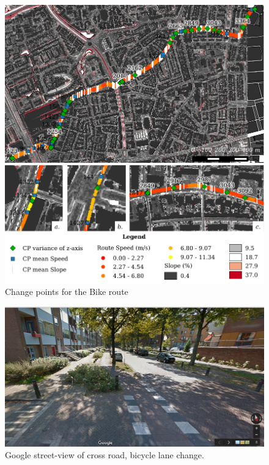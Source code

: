 \begin{figure}[hb]
\includegraphics[width=\textwidth]{img/R_Bikeroute.pdf}
\centering
\caption{Change points for the Bike route\label{routeB2}}
\end{figure} 

\clearpage

\begin{figure}[!ht]
\includegraphics[width=\textwidth]{img/R_crossroad.png}
\centering
\caption{Google street-view of cross road, bicycle lane change. \label{crossroad}}
\end{figure} 

